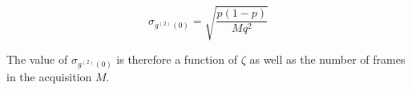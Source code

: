 \begin{equation}
\sigma_{g^{(2)}(0)}=\sqrt{\frac{p(1-p)}{M q^{2}}}
\end{equation}

The value of $\sigma_{g^{(2)}(0)}$ is therefore a function of $\zeta$ as well as the number of frames in the acquisition $M$. 










